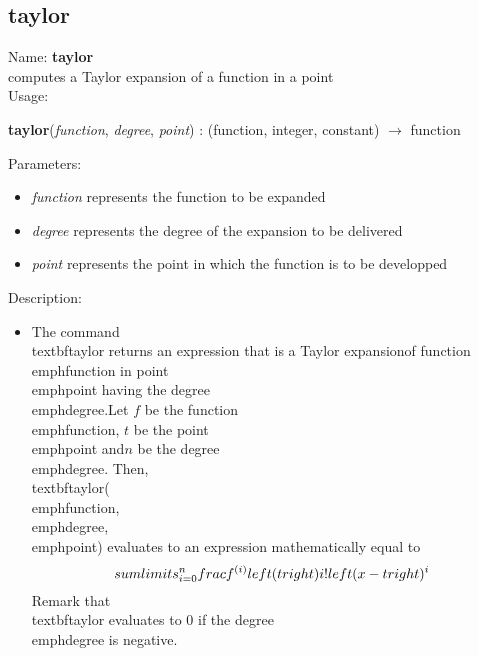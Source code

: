 \subsection{taylor}
\label{labtaylor}
\noindent Name: \textbf{taylor}\\
computes a Taylor expansion of a function in a point\\
\noindent Usage: 
\begin{center}
\textbf{taylor}(\emph{function}, \emph{degree}, \emph{point}) : (\textsf{function}, \textsf{integer}, \textsf{constant}) $\rightarrow$ \textsf{function}\\
\end{center}
Parameters: 
\begin{itemize}
\item \emph{function} represents the function to be expanded
\item \emph{degree} represents the degree of the expansion to be delivered
\item \emph{point} represents the point in which the function is to be developped
\end{itemize}
\noindent Description: \begin{itemize}

\item The command \\textbf{taylor} returns an expression that is a Taylor expansion\n   of function \\emph{function} in point \\emph{point} having the degree \\emph{degree}.\n    \n   Let $f$ be the function \\emph{function}, $t$ be the point \\emph{point} and\n   $n$ be the degree \\emph{degree}. Then, \\textbf{taylor}(\\emph{function},\\emph{degree},\\emph{point}) \n   evaluates to an expression mathematically equal to \n   $$\\sum\\limits_{i=0}^n \\frac{f^{(i)}\\left(t\\right)}{i!} \\left(x - t \\right)^i$$\n    \n   Remark that \\textbf{taylor} evaluates to $0$ if the degree \\emph{degree} is negative.\n\end{itemize}

